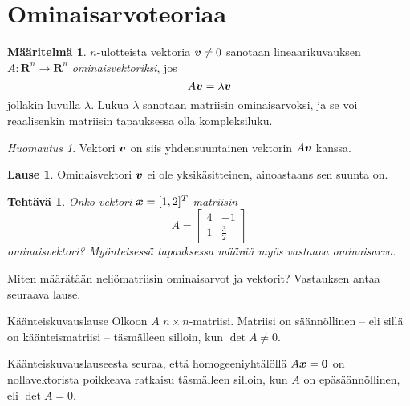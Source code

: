 \documentclass[a4paper, 12pt]{article}
\date{\dmyyyydate\today}
\newcommand{\vek}[1]{\mbox{\boldmath$#1$}}
\renewcommand{\vec}[1]{\vek{#1}}
\theoremstyle{exercise}
\newtheorem{teht}{Tehtävä}
\theoremstyle{remark}
\newtheorem*{huom}{Huomautus}
\theoremstyle{definition}
\newtheorem*{theorem}{Lause}
\newtheorem*{määr}{Määritelmä}
\begin{document}
\section*{Ominaisarvoteoriaa}
\begin{tcolorbox}
\begin{määr}
$n$-ulotteista vektoria $\vec{v}\neq 0$ sanotaan lineaarikuvauksen $A:\mathbf{R}^n\to\mathbf{R}^n$ \emph{ominaisvektoriksi}, jos 
$$
A\vec{v}=\lambda\vec{v}
$$
jollakin luvulla $\lambda.$ Lukua $\lambda$ sanotaan matriisin ominaisarvoksi, ja se voi reaalisenkin matriisin tapauksessa olla kompleksiluku.

\end{määr}
\begin{huom}
Vektori $\vec{v}$ on siis yhdensuuntainen vektorin $A\vec{v}$ kanssa.
\end{huom}

\end{tcolorbox}

\begin{theorem}
Ominaisvektori $\vec{v}$ ei ole yksikäsitteinen, ainoastaans sen suunta on.
\end{theorem}

\begin{teht}
Onko vektori $\vec{x}=[1,2]^T$ matriisin 
$$
A=\begin{bmatrix}
4 & -1\\
1 & \frac{3}{2}
\end{bmatrix}
$$
ominaisvektori? Myönteisessä tapauksessa määrää myös vastaava ominaisarvo.
\end{teht}

Miten määrätään neliömatriisin ominaisarvot ja vektorit? Vastauksen antaa seuraava lause.

\begin{mybox}{Käänteiskuvauslause}
Olkoon $A$ $n\times n$-matriisi. Matriisi on säännöllinen -- eli sillä on käänteismatriisi -- täsmälleen silloin, kun $\det A\neq 0.$
\end{mybox}

Käänteiskuvauslauseesta seuraa, että homogeeniyhtälöllä
$A\vec{x}=\vec{0}$ on nollavektorista poikkeava ratkaisu täsmälleen silloin, kun $A$ on epäsäännöllinen, eli $\det A=0.$
\end{document}

